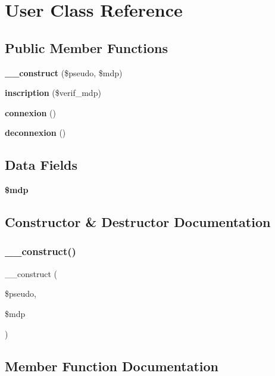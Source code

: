 \section{User Class Reference}
\label{class_user}
\subsection*{Public Member Functions}
\begin{DoxyCompactItemize}
\item 
\textbf{ \+\_\+\+\_\+construct} (\$pseudo, \$mdp)
\item 
\textbf{ inscription} (\$verif\+\_\+mdp)
\item 
\textbf{ connexion} ()
\item 
\textbf{ deconnexion} ()
\end{DoxyCompactItemize}
\subsection*{Data Fields}
\begin{DoxyCompactItemize}
\item 
\textbf{ \$mdp}
\end{DoxyCompactItemize}


\subsection{Constructor \& Destructor Documentation}
\mbox{\label{class_user_ac60cdf778bb368629105b8ce6d23b512}} 
\subsubsection{\+\_\+\+\_\+construct()}
{\footnotesize\ttfamily \+\_\+\+\_\+construct (\begin{DoxyParamCaption}\item[{}]{\$pseudo,  }\item[{}]{\$mdp }\end{DoxyParamCaption})}



\subsection{Member Function Documentation}
\mbox{\label{class_user_a72636d5958b9e74f0bf44d4f8088036e}} 
